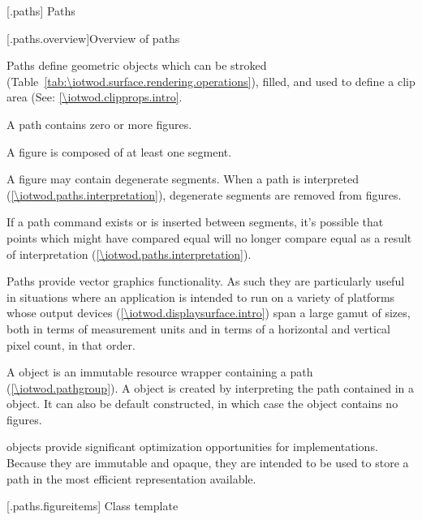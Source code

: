 
 [\iotwod.paths] {Paths}

 [\iotwod.paths.overview]{Overview of paths}

\pnum
Paths define geometric objects which can be stroked (Table~\ref{tab:\iotwod.surface.rendering.operations}), filled, and used to define a clip area (See: \ref{\iotwod.clipprops.intro}.

\pnum
A path contains zero or more figures.

\pnum
A figure is composed of at least one segment.

\pnum
A figure may contain degenerate segments. When a path is interpreted (\ref{\iotwod.paths.interpretation}), degenerate segments are removed from figures.
\begin{note}
If a path command exists or is inserted between segments, it's possible that points which might have compared equal will no longer compare equal as a result of interpretation (\ref{\iotwod.paths.interpretation}).
\end{note}

\pnum
Paths provide vector graphics functionality. As such they are particularly useful in situations where an application is intended to run on a variety of platforms whose output devices (\ref{\iotwod.displaysurface.intro}) span a large gamut of sizes, both in terms of measurement units and in terms of a horizontal and vertical pixel count, in that order.

\pnum
A  object is an immutable resource wrapper containing a path (\ref{\iotwod.pathgroup}). A  object is created by interpreting the path contained in a  object. It can also be default constructed, in which case the  object contains no figures.
\begin{note}
 objects provide significant optimization opportunities for implementations. Because they are immutable and opaque, they are intended to be used to store a path in the most efficient representation available.
\end{note}



 [\iotwod.paths.figureitems] {Class template }

\addtocounter{SectionDepthBase}{2}















\addtocounter{SectionDepthBase}{-2}

\addtocounter{SectionDepthBase}{1}


\addtocounter{SectionDepthBase}{-1}

